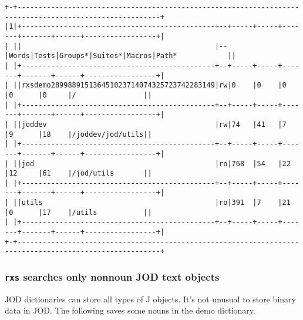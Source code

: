 \documentclass[11pt,letter,landscape]{article}
\begin{document}
    \begin{Verbatim}[commandchars=\\\{\}]
+-+--------------------------------------------------------------------------------------------------------+
|1|+----------------------------------------------+--+-----+-----+-------+-------+------+-----------------+|
| ||                                              |--|Words|Tests|Groups*|Suites*|Macros|Path*            ||
| |+----------------------------------------------+--+-----+-----+-------+-------+------+-----------------+|
| ||rxsdemo289988915136451023714074325723742283149|rw|0    |0    |0      |0      |0     |/                ||
| |+----------------------------------------------+--+-----+-----+-------+-------+------+-----------------+|
| ||joddev                                        |rw|74   |41   |7      |9      |18    |/joddev/jod/utils||
| |+----------------------------------------------+--+-----+-----+-------+-------+------+-----------------+|
| ||jod                                           |ro|768  |54   |22     |12     |61    |/jod/utils       ||
| |+----------------------------------------------+--+-----+-----+-------+-------+------+-----------------+|
| ||utils                                         |ro|391  |7    |21     |0      |17    |/utils           ||
| |+----------------------------------------------+--+-----+-----+-------+-------+------+-----------------+|
+-+--------------------------------------------------------------------------------------------------------+

    \end{Verbatim}

    \subsubsection{\texorpdfstring{\texttt{rxs} searches only nonnoun JOD
text
objects}{rxs searches only nonnoun JOD text objects}}\label{rxs-searches-only-nonnoun-jod-text-objects}

JOD dictionaries can store all types of J objects. It's not unusual to
store binary data in JOD. The following saves some nouns in the demo
dictionary.
\end{document}
